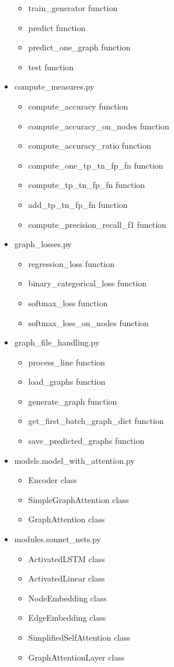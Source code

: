 \begin{itemize}
\begin{itemize}
		\item train\_generator function
		\item predict function
		\item predict\_one\_graph function
		\item test function
	\end{itemize}
	\item compute\_measures.py
	\begin{itemize}
		\item compute\_accuracy function
		\item compute\_accuracy\_on\_nodes function
		\item compute\_accuracy\_ratio function
		\item compute\_one\_tp\_tn\_fp\_fn function
		\item compute\_tp\_tn\_fp\_fn function
		\item add\_tp\_tn\_fp\_fn function
		\item compute\_precision\_recall\_f1 function
	\end{itemize}
	\item graph\_losses.py
	\begin{itemize}
		\item regression\_loss function
		\item binary\_categorical\_loss function
		\item softmax\_loss function
		\item softmax\_loss\_on\_nodes function
	\end{itemize}
	\item graph\_file\_handling.py
	\begin{itemize}
		\item process\_line function
		\item load\_graphs function
		\item generate\_graph function
		\item get\_first\_batch\_graph\_dict function
		\item save\_predicted\_graphs function
	\end{itemize}
	\item models.model\_with\_attention.py
	\begin{itemize}
		\item Encoder class
		\item SimpleGraphAttention class
		\item GraphAttention class
	\end{itemize}
	\item modules.sonnet\_nets.py
	\begin{itemize}
		\item ActivatedLSTM class
		\item ActivatedLinear class
		\item NodeEmbedding class
		\item EdgeEmbedding class
		\item SimplifiedSelfAttention class
		\item GraphAttentionLayer class
	\end{itemize}
\end{itemize}

